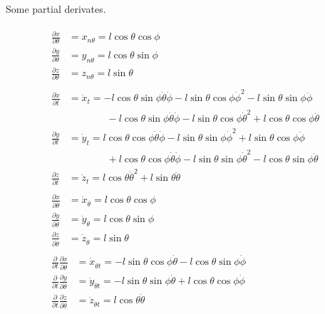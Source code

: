 \documentclass{scrartcl}
\begin{document}
Some partial derivates.

\begin{align}
  \begin{split}
    \frac{\partial x}{\partial \theta}& = x_{n\theta} = l \cos{\theta} \cos{\phi} \\
    \frac{\partial y}{\partial \theta}& = y_{n\theta} = l \cos{\theta} \sin{\phi} \\
    \frac{\partial z}{\partial \theta}& = z_{n\theta} = l \sin{\theta}
  \end{split}
  \\
  \begin{split}
    \frac{\partial \dot{x}}{\partial t} & = \dot{x}_{t}
      = - l\cos{\theta} \sin{\phi} \dot{\theta} \dot{\phi}
      - l\sin{\theta} \cos{\phi} \dot{\phi}^2
      - l\sin{\theta} \sin{\phi} \ddot{\phi}
      \\&\phantom{{}=xn={}}- l\cos{\theta}\sin{\phi} \dot{\theta} \dot{\phi}
      - l\sin{\theta}\cos{\phi} \dot{\theta}^2
      + l\cos{\theta}\cos{\phi} \ddot{\theta}
    \\
    \frac{\partial \dot{y}}{\partial t} & = \dot{y}_{t}
      = l\cos{\theta} \cos\phi \dot{\theta} \dot{\phi}
      - l\sin{\theta} \sin\phi \dot{\phi}^2
      + l\sin{\theta} \cos\phi \ddot{\phi}
      \\&\phantom{{}=xn={}}
      + l\cos\theta\cos{\phi} \dot{\theta} \dot{\phi}
      - l\sin\theta\sin{\phi} \dot{\theta}^2
      - l\cos\theta\sin{\phi} \ddot{\theta}
    \\
    \frac{\partial \dot{z}}{\partial t} & = \dot{z}_{t}
      = l\cos\theta \dot{\theta}^2 + l\sin\theta \ddot{\theta}
  \end{split}
  \\
  \begin{split}
    \frac{\partial \dot{x}}{\partial \dot{\theta}}& = \dot{x}_{\dot{\theta}} 
      = l\cos{\theta}\cos{\phi} \\
    \frac{\partial \dot{y}}{\partial \dot{\theta}}& = \dot{y}_{\dot{\theta}} 
      = l\cos\theta\sin{\phi}\\
    \frac{\partial \dot{z}}{\partial \dot{\theta}}& = \dot{z}_{\dot{\theta}} 
      = l\sin\theta
  \end{split}
  \\
  \begin{split}
    \frac{\partial}{\partial t}\frac{\partial \dot{x}}{\partial \dot{\theta}}& = \dot{x}_{\dot{\theta}t} 
      = -l\sin{\theta}\cos{\phi} \dot{\theta} - l\cos{\theta}\sin{\phi}  \dot{\phi}\\
      \frac{\partial}{\partial t}\frac{\partial \dot{y}}{\partial \dot{\theta}}& = \dot{y}_{\dot{\theta}t} 
      = -l\sin{\theta}\sin{\phi} \dot{\theta} + l\cos{\theta}\cos{\phi}  \dot{\phi}\\
      \frac{\partial}{\partial t}\frac{\partial \dot{z}}{\partial \dot{\theta}}& = \dot{z}_{\dot{\theta}t} 
      = l\cos\theta \dot{\theta}
  \end{split}
\end{align}
\end{document}
